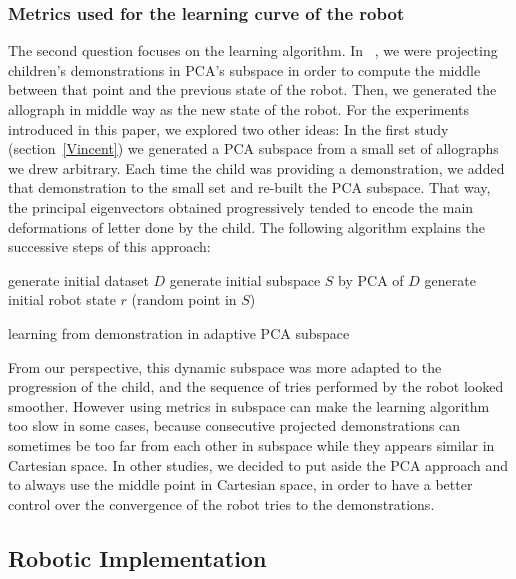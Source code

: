 \documentclass[conference]{IEEEtran}
\begin{document}
\subsubsection{Metrics used for the learning curve of the robot}
The second question focuses on the learning algorithm. In
~\cite{Hood}, we were projecting children's demonstrations in PCA's subspace in order to 
compute the middle between that point and the previous state of the robot. Then, we
generated the allograph in middle way as the new state of
the robot. For the experiments introduced in this paper, we explored two other
ideas: In the first study (section~\ref{Vincent}) we generated a PCA subspace from a
small set of allographs we drew arbitrary. Each time the child was providing a
demonstration, we added that demonstration to the small set and re-built the
PCA subspace. That way, the principal eigenvectors obtained progressively
tended to encode the main deformations of letter done by the child. The following algorithm explains the successive steps of this approach:

\begin{algorithm}
   generate initial dataset $D$\;
   generate initial subspace $S$ by PCA of $D$\;
   generate initial robot state $r$ (random point in $S$)\;
   \caption{learning from demonstration in adaptive PCA subspace}
\end{algorithm}

From our perspective, this dynamic subspace was more adapted to the 
progression of the child, and the sequence of tries performed by the robot looked smoother.
However using metrics in subspace can make the learning algorithm too slow in some
cases, because consecutive projected demonstrations can sometimes be too
far from each other in subspace while they appears similar in Cartesian space.
In other studies, we decided to put aside the PCA approach and to always use the middle point in Cartesian space, in order to
have a better control over the convergence of the robot tries to the demonstrations.


\subsection{Robotic Implementation}
\end{document}
